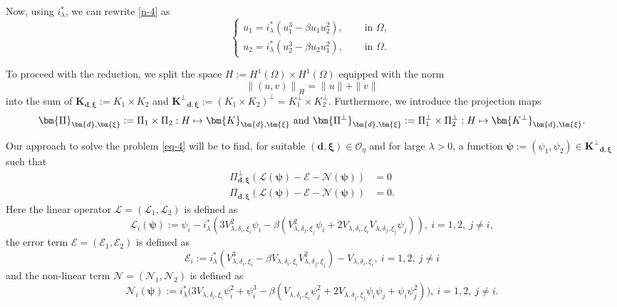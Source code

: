 \documentclass[a4paper,reqno,11pt,oneside]{amsart}
\numberwithin{equation}{section}
\begin{document}
 Now, using $i_\lambda^{*}$, we can rewrite \eqref{n-4} as
\begin{equation} \label{eq-4}
    \begin{cases}
u_1=i_\lambda^{*}\left(u_1^3-\beta u_1u_2^2\right),\quad&\text{ in $\Omega$, }\\
u_2=i_\lambda^{*}\left(u_2^3-\beta u_2u_1^2\right),\quad&\text{ in $\Omega$. }
    \end{cases}
\end{equation}


To proceed with the reduction, we split the space { $H:=H^1( \Omega)\times H^1( \Omega)$ equipped with the norm } 
{ $$\left\|(u,v)\right\|_{H}=\|u\|+\|v\|$$}
into the sum of $\bm{K}_{\bm{d},\bm{\xi}}:={K_1}\times K_2$ and $\bm{K^{\perp}}_{\bm{d},\bm{\xi}}:=\left({K_1}\times K_2\right)^{\perp}={K^{\perp}_1}\times K^{\perp}_2$.
Furthermore, 
we introduce the projection maps $${\bm{\Pi}_{\bm{d},\bm{\xi}}}:={\Pi_1}\times {\Pi_2}:H \mapsto \bm{K}_{\bm{d},\bm{\xi}}\ \hbox{and}\
 \bm{\Pi^{\perp}}_{\bm{d},\bm{\xi}}:={\Pi^{\perp}_1}\times {\Pi^{\perp}_2}:H\mapsto \bm{K^{\perp}}_{\bm{d},\bm{\xi}}.$$

Our approach to solve the problem \eqref{eq-4} will be to find, for suitable $\left(\bm{d}, \bm{\xi}\right) \in \mathcal{O}_\eta$ and for large $\lambda>0$, a function $\bm{\psi}:=\left(\psi_1,\psi_{2}\right) \in \bm{K^{\perp}}_{\bm{d},\bm{\xi}}$ such that 
 \begin{align}
    \label{vec-1} \Pi^{\perp}_{\bm{d},\bm{\xi}}\left(\bm{\mathcal{L}}(\bm{\psi})-\bm{\mathcal{E}}-\bm{\mathcal{N}}(\bm{\psi})\right)&=0\\
    \label{vec-2}\Pi_{\bm{d},\bm{\xi}}\left(\bm{\mathcal{L}}(\bm{\psi})-\bm{\mathcal{E}}-\bm{\mathcal{N}}(\bm{\psi})\right)&=0.
\end{align}
Here the linear operator $\bm{\mathcal{L}}=\left(\mathcal{L}_1,\mathcal{L}_2\right)$ is defined as
$$ \mathcal{L}_i(\bm{\psi}):=  \psi_i-i_\lambda^{*}\left(3V_{\lambda,\delta_i,\xi_i}^2\psi_i-\beta\left(V_{\lambda,\delta_j,\xi_j}^2\psi_i+2V_{\lambda,\delta_i,\xi_i}V_{\lambda,\delta_j,\xi_j}\psi_j\right)\right),\ i=1,2,\ j\not =i,$$
the error term 
 $\bm{\mathcal{E}}=\left(\mathcal{E}_1,\mathcal{E}_2\right)$ is defined as
 $$\mathcal{E}_i:= i_\lambda^{*}\left(V_{\lambda,\delta_i,\xi_i}^3-\beta V_{\lambda,\delta_i,\xi_i}V_{\lambda,\delta_j,\xi_j}^2\right)-V_{\lambda,\delta_i,\xi_i},\ i=1,2,\ j\not =i$$
 and the non-linear term
 $\bm{\mathcal{N}}=\left(\mathcal{N}_1,\mathcal{N}_2\right)$ is defined as
$$\mathcal{N}_i(\bm{\psi}):={i_\lambda^{*}\Big(3V_{\lambda,\delta_i,\xi_i} \psi_i^2+ \psi_i^3-\beta\left(V_{\lambda,\delta_i,\xi_i}\psi_j^2+2V_{\lambda,\delta_j,\xi_j}\psi_i\psi_j+\psi_i\psi_j^2\right)\Big)},\ i=1,2,\ j\not =i.$$
 
\end{document}
